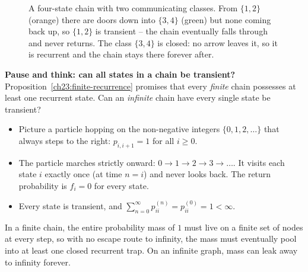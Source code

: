 \begin{figure}[H]
\centering
{}
\caption{A four-state chain with two communicating classes. From $\{1,2\}$ (orange) there are
doors down into $\{3,4\}$ (green) but none coming back up, so $\{1,2\}$ is transient -- the
chain eventually falls through and never returns. The class $\{3,4\}$ is closed: no arrow
leaves it, so it is recurrent and the chain stays there forever after.}
\label{ch23:fig-classes}
\end{figure}

\begin{recoverybox}
\textbf{Pause and think: can all states in a chain be transient?}
Proposition~\ref{ch23:finite-recurrence} promises that every \emph{finite} chain possesses at least one recurrent state. Can an \emph{infinite} chain have every single state be transient?
\begin{itemize}
  \item Picture a particle hopping on the non-negative integers $\{0, 1, 2, \dots\}$ that always steps to the right: $p_{i, i+1} = 1$ for all $i \ge 0$.
  \item The particle marches strictly onward: $0 \to 1 \to 2 \to 3 \to \dots$. It visits each state $i$ exactly once (at time $n=i$) and never looks back. The return probability is $f_i = 0$ for every state.
  \item Every state is transient, and $\sum_{n=0}^\infty p_{ii}^{(n)} = p_{ii}^{(0)} = 1 < \infty$.
\end{itemize}
In a finite chain, the entire probability mass of $1$ must live on a finite set of nodes at every step, so with no escape route to infinity, the mass must eventually pool into at least one closed recurrent trap. On an infinite graph, mass can leak away to infinity forever.
\end{recoverybox}

